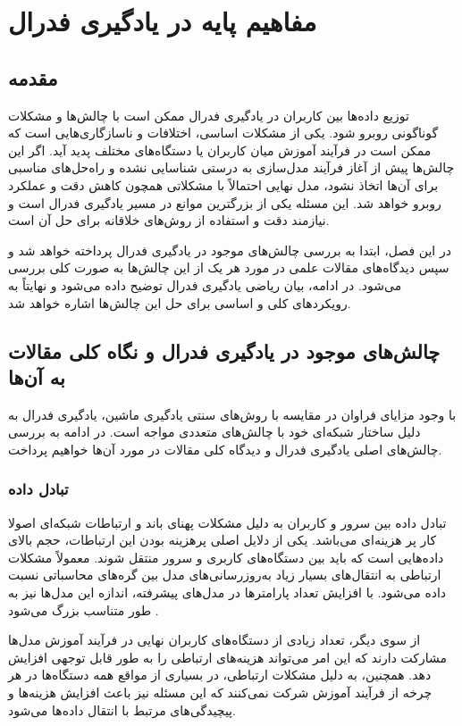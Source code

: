\chapter{مفاهیم پایه در یادگیری فدرال}

\section{مقدمه}
توزیع داده‌ها بین کاربران در یادگیری فدرال ممکن است با چالش‌ها و مشکلات گوناگونی روبرو شود. یکی از مشکلات اساسی، اختلافات و ناسازگاری‌هایی است که ممکن است در فرآیند آموزش میان کاربران یا دستگاه‌های مختلف پدید آید. اگر این چالش‌ها پیش از آغاز فرآیند مدل‌سازی به درستی شناسایی نشده و راه‌حل‌های مناسبی برای آن‌ها اتخاذ نشود، مدل نهایی احتمالاً با مشکلاتی همچون کاهش دقت و عملکرد روبرو خواهد شد. این مسئله یکی از بزرگترین موانع در مسیر یادگیری فدرال است و نیازمند دقت و استفاده از روش‌های خلاقانه برای حل آن است.

در این فصل، ابتدا به بررسی چالش‌های موجود در یادگیری فدرال پرداخته خواهد شد و سپس دیدگاه‌های مقالات علمی در مورد هر یک از این چالش‌ها به صورت کلی بررسی می‌شود. در ادامه، بیان ریاضی یادگیری فدرال توضیح داده می‌شود و نهایتاً به رویکردهای کلی و اساسی برای حل این چالش‌ها اشاره خواهد شد.


\section{چالش‌های موجود در یادگیری فدرال و نگاه کلی مقالات به آن‌ها}
با وجود مزایای فراوان در مقایسه با روش‌های سنتی یادگیری ماشین، یادگیری فدرال به دلیل ساختار شبکه‌ای خود با چالش‌های متعددی مواجه است. در ادامه به بررسی چالش‌های اصلی یادگیری فدرال و دیدگاه کلی مقالات در مورد آن‌ها خواهیم پرداخت.


\subsection{تبادل داده}
تبادل داده بین سرور و کاربران به دلیل مشکلات پهنای باند و ارتباطات شبکه‌ای اصولا کار پر هزینه‌ای می‌باشد. یکی از دلایل اصلی پرهزینه بودن این ارتباطات، حجم بالای داده‌هایی است که باید بین دستگاه‌های کاربری و سرور منتقل شوند.
معمولاً مشکلات ارتباطی به انتقال‌های بسیار زیاد به‌روزرسانی‌های مدل بین گره‌های محاسباتی نسبت داده می‌شود. با افزایش تعداد پارامترها در مدل‌های پیشرفته، اندازه این مدل‌ها نیز به طور متناسب بزرگ می‌شود
\cite{wang2018atomo}.

از سوی دیگر، تعداد زیادی از دستگاه‌های کاربران نهایی در فرآیند آموزش مدل‌ها مشارکت دارند که این امر می‌تواند هزینه‌های ارتباطی را به طور قابل توجهی افزایش دهد. همچنین، به دلیل مشکلات ارتباطی، در بسیاری از مواقع همه دستگاه‌ها در هر چرخه از فرآیند آموزش شرکت نمی‌کنند که این مسئله نیز باعث افزایش هزینه‌ها و پیچیدگی‌های مرتبط با انتقال داده‌ها می‌شود.


